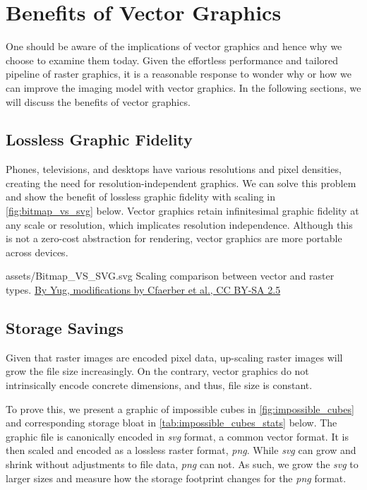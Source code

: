 \section{Benefits of Vector Graphics}
One should be aware of the implications of vector graphics and hence why we choose to examine them today. Given the effortless performance and tailored pipeline of raster graphics, it is a reasonable response to wonder why or how we can improve the imaging model with vector graphics. In the following sections, we will discuss the benefits of vector graphics.

\subsection{Lossless Graphic Fidelity}
Phones, televisions, and desktops have various resolutions and pixel densities, creating the need for resolution-independent graphics. We can solve this problem and show the benefit of lossless graphic fidelity with scaling in \cref{fig:bitmap_vs_svg} below. Vector graphics retain infinitesimal graphic fidelity at any scale or resolution, which implicates resolution independence. Although this is not a zero-cost abstraction for rendering, vector graphics are more portable across devices.\medskip

\svg
{assets/Bitmap_VS_SVG.svg}
{\label{fig:bitmap_vs_svg}Scaling comparison between vector and raster types.}
{\href{https://commons.wikimedia.org/w/index.php?curid=1183592}{By Yug, modifications by Cfaerber et al., CC BY-SA 2.5}}\medskip

\subsection{Storage Savings}\label{sec:storage_savings}
Given that raster images are encoded pixel data, up-scaling raster images will grow the file size increasingly. On the contrary, vector graphics do not intrinsically encode concrete dimensions, and thus, file size is constant.\medskip

To prove this, we present a graphic of impossible cubes in \cref{fig:impossible_cubes} and corresponding storage bloat in \cref{tab:impossible_cubes_stats} below. The graphic file is canonically encoded in \textit{svg} format, a common vector format. It is then scaled and encoded as a lossless raster format, \textit{png}. While \textit{svg} can grow and shrink without adjustments to file data, \textit{png} can not. As such, we grow the \textit{svg} to larger sizes and measure how the storage footprint changes for the \textit{png} format.\medskip

